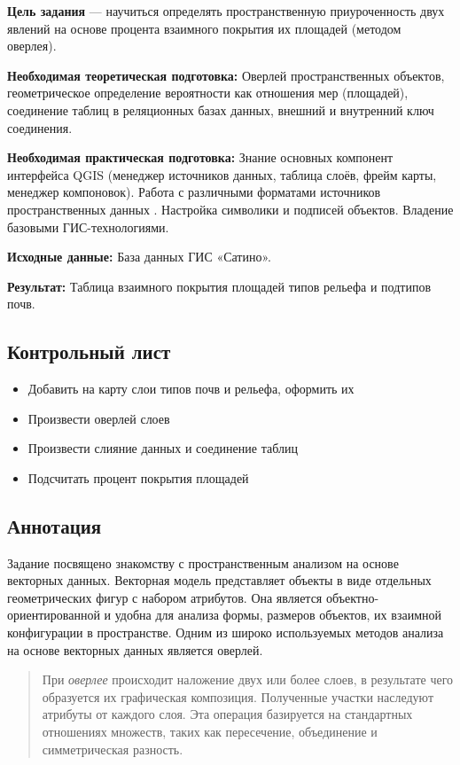 \documentclass[
  12pt,
]{book}
\providecommand{\tightlist}{%
  \setlength{\itemsep}{0pt}\setlength{\parskip}{0pt}}
\begin{document}
\textbf{Цель задания} --- научиться определять пространственную приуроченность двух явлений на основе процента взаимного покрытия их площадей (методом оверлея).

\textbf{Необходимая теоретическая подготовка:} Оверлей пространственных объектов, геометрическое определение вероятности как отношения мер (площадей), соединение таблиц в реляционных базах данных, внешний и внутренний ключ соединения.

\textbf{Необходимая практическая подготовка:} Знание основных компонент интерфейса QGIS (менеджер источников данных, таблица слоёв, фрейм карты, менеджер компоновок). Работа с различными форматами источников пространственных данных . Настройка символики и подписей объектов. Владение базовыми ГИС-технологиями.

\textbf{Исходные данные:} База данных ГИС «Сатино».

\textbf{Результат:} Таблица взаимного покрытия площадей типов рельефа и подтипов почв.

\hypertarget{overlay-control}{%
\subsection{Контрольный лист}\label{overlay-control}}

\begin{itemize}
\tightlist
\item
  Добавить на карту слои типов почв и рельефа, оформить их
\item
  Произвести оверлей слоев
\item
  Произвести слияние данных и соединение таблиц
\item
  Подсчитать процент покрытия площадей
\end{itemize}

\hypertarget{overlay-annotation}{%
\subsection{Аннотация}\label{overlay-annotation}}

Задание посвящено знакомству с пространственным анализом на основе векторных данных. Векторная модель представляет объекты в виде отдельных геометрических фигур с набором атрибутов. Она является объектно-ориентированной и удобна для анализа формы, размеров объектов, их взаимной конфигурации в пространстве. Одним из широко используемых методов анализа на основе векторных данных является оверлей.

\begin{quote}
При \emph{оверлее} происходит наложение двух или более слоев, в результате чего образуется их графическая композиция. Полученные участки наследуют атрибуты от каждого слоя. Эта операция базируется на стандартных отношениях множеств, таких как пересечение, объединение и симметрическая разность.
\end{quote}
\end{document}
